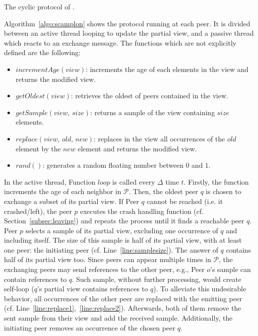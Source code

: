 \begin{algorithm}[h] %
  
  \caption{\label{algo:scamplon}The cyclic protocol of \SPRAY{}.}
\end{algorithm}

Algorithm~\ref{algo:scamplon} shows the \SPRAY{} protocol running at each
peer. It is divided between an active thread looping to update the partial
view, and a passive thread which reacts to an exchange message. The functions
which are not explicitly defined are the following:
\begin{itemize}
\item $incrementAge(view)$: increments the age of each elements in the view
  and returns the modified view.
\item $getOldest(view)$: retrieves the oldest of peers contained in the view.
\item $getSample(view, \, size)$: returns a sample of the view containing
  $size$ elements.
\item $replace(view,\,old,\,new)$: replaces in the view all occurrences of
  the $old$ element by the $new$ element and returns the modified view.
\item $rand()$: generates a random floating number between $0$ and $1$.
\end{itemize}

In the active thread, Function $loop$ is called every $\Delta$ time
$t$. Firstly, the function increments the age of each neighbor in
$\mathcal{P}$. Then, the oldest peer $q$ is chosen to exchange a subset of its
partial view. If Peer $q$ cannot be reached (i.e. it crashed/left), the peer
$p$ executes the crash handling function (cf. Section~\ref{subsec:leaving}) and
repeats the process until it finds a reachable peer $q$. Peer $p$ selects a
sample of its partial view, excluding one occurrence of $q$ and including
itself. The size of this sample is half of its partial view, with at least one
peer: the initiating peer (cf. Line~\ref{line:samplesize}). The answer of $q$
contains half of its partial view too. Since peers can appear multiple times in
$\mathcal{P}$, the exchanging peers may send references to the other peer,
e.g., Peer $o$'s sample can contain references to $q$. Such sample, without
further processing, would create self-loop ($q$'s partial view contains
references to $q$). To alleviate this undesirable behavior, all occurrences of
the other peer are replaced with the emitting peer
(cf. Line~\ref{line:replace1},~\ref{line:replace2}).  Afterwards, both of
them remove the sent sample from their view and add the received
sample. Additionally, the initiating peer removes an occurrence of the chosen
peer $q$.


